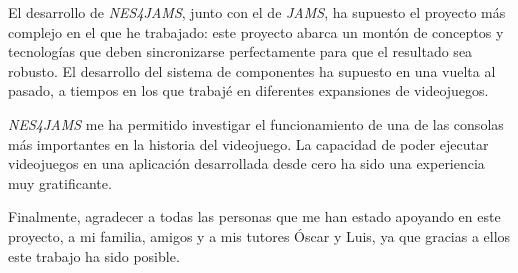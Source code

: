 El desarrollo de \textit{NES4JAMS}, junto con el
de \textit{JAMS}, ha supuesto el proyecto más complejo en el
que he trabajado:
este proyecto abarca un montón de conceptos y tecnologías
que deben sincronizarse perfectamente para que el resultado
sea robusto.
El desarrollo del sistema de componentes ha supuesto en una
vuelta al pasado, a tiempos en los que trabajé
en diferentes expansiones de videojuegos.

\textit{NES4JAMS} me ha permitido investigar el funcionamiento
de una de las consolas más importantes en la
historia del videojuego.
La capacidad de poder ejecutar videojuegos en una aplicación
desarrollada desde cero ha sido una experiencia muy gratificante.

Finalmente, agradecer a todas las personas que me han
estado apoyando en este proyecto, a mi familia, amigos y a mis
tutores Óscar y Luis, ya que gracias a ellos este trabajo
ha sido posible.
